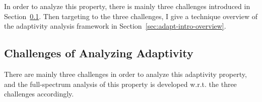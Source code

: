 In order to analyze this property, there is mainly three challenges introduced in Section~\ref{sec:adapt-intro-challenge}.
Then targeting to the three challenges, I give a technique overview of the adaptivity analysis framework in Section~\ref{sec:adapt-intro-overview}.

\subsection{Challenges of Analyzing Adaptivity}
\label{sec:adapt-intro-challenge}
There are mainly three challenges in order to analyze this adaptivity property, 
and the full-spectrum analysis of this property is 
developed w.r.t. the three challenges accordingly.

